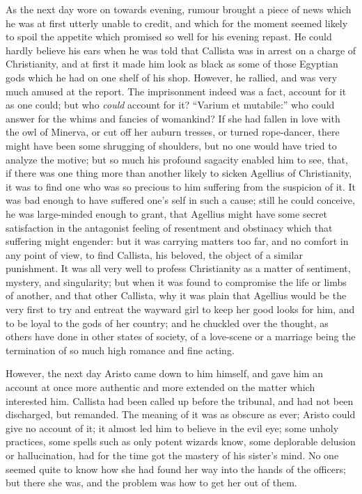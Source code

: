 As the next day wore on towards evening, rumour brought a piece of
news which he was at first utterly unable to credit, and which for the
moment seemed likely to spoil the appetite which promised so well for
his evening repast. He could hardly believe his ears when he was told
that Callista was in arrest on a charge of Christianity, and at first
it made him look as black as some of those Egyptian gods which he had
on one shelf of his shop. However, he rallied, and was very much
amused at the report. The imprisonment indeed was a fact, account for
it as one could; but who \emph{could} account for it? ``Varium et
mutabile:'' who could answer for the whims and fancies of
womankind? If she had fallen in love with the owl of Minerva, or cut
off her auburn tresses, or turned rope-dancer, there might have been
some shrugging of shoulders, but no one would have tried to analyze
the motive; but so much his profound sagacity enabled him to
see, that, if there was one thing more than another likely to sicken
Agellius of Christianity, it was to find one who was so precious to
him suffering from the suspicion of it. It was bad enough to have
suffered one's self in such a cause; still he could conceive, he was
large-minded enough to grant, that Agellius might have some secret
satisfaction in the antagonist feeling of resentment and obstinacy
which that suffering might engender: but it was carrying matters too
far, and no comfort in any point of view, to find Callista, his
beloved, the object of a similar punishment. It was all very well to
profess Christianity as a matter of sentiment, mystery, and
singularity; but when it was found to compromise the life or limbs of
another, and that other Callista, why it was plain that Agellius would
be the very first to try and entreat the wayward girl to keep her good
looks for him, and to be loyal to the gods of her country; and he
chuckled over the thought, as others have done in other states of
society, of a love-scene or a marriage being the termination of so
much high romance and fine acting.

However, the next day Aristo came down to him himself, and gave him
an account at once more authentic and more extended on the matter
which interested him. Callista had been called up before the tribunal,
and had not been discharged, but remanded. The meaning of it was as
obscure as ever; Aristo could give no account of it; it almost led him
to believe in the evil eye; some unholy practices, some spells
such as only potent wizards know, some deplorable delusion or
hallucination, had for the time got the mastery of his sister's mind.
No one seemed quite to know how she had found her way into the hands
of the officers; but there she was, and the problem was how to get her
out of them.

